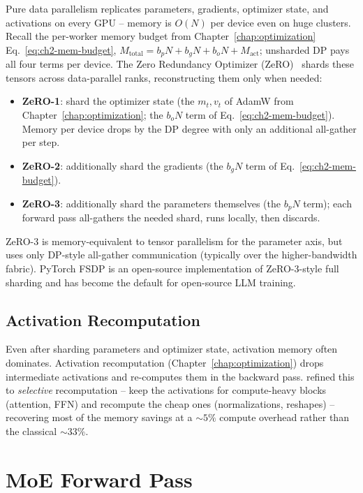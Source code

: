 Pure data parallelism replicates parameters, gradients, optimizer
state, and activations on every GPU -- memory is $O(N)$ per device
even on huge clusters. Recall the per-worker memory budget from
Chapter~\ref{chap:optimization} Eq.~\eqref{eq:ch2-mem-budget},
$M_{\mathrm{total}} = b_p N + b_g N + b_o N + M_{\mathrm{act}}$;
unsharded DP pays all four terms per device. The Zero Redundancy
Optimizer (ZeRO)~\citep{rajbhandari2020zero} shards these tensors
across data-parallel ranks, reconstructing them only when needed:
\begin{itemize}
  \item \textbf{ZeRO-1}: shard the optimizer state (the $m_t, v_t$ of
        AdamW from Chapter~\ref{chap:optimization}; the $b_o N$ term of
        Eq.~\eqref{eq:ch2-mem-budget}). Memory per device drops by
        the DP degree with only an additional all-gather per step.
  \item \textbf{ZeRO-2}: additionally shard the gradients (the
        $b_g N$ term of Eq.~\eqref{eq:ch2-mem-budget}).
  \item \textbf{ZeRO-3}: additionally shard the parameters themselves
        (the $b_p N$ term); each forward pass all-gathers the needed
        shard, runs locally, then discards.
\end{itemize}
ZeRO-3 is memory-equivalent to tensor parallelism for the
parameter axis, but uses only DP-style all-gather communication
(typically over the higher-bandwidth fabric). PyTorch FSDP
\citep{zhao2023fsdp} is an open-source implementation of
ZeRO-3-style full sharding and has become the default for
open-source LLM training.

\subsection{Activation Recomputation}

Even after sharding parameters and optimizer state, activation memory
often dominates. Activation recomputation \citep{chen2016training}
(Chapter~\ref{chap:optimization}) drops intermediate activations and re-computes them in the
backward pass. \citet{korthikanti2023reducing} refined this to
\emph{selective} recomputation -- keep the activations for
compute-heavy blocks (attention, FFN) and recompute the cheap ones
(normalizations, reshapes) -- recovering most of the memory savings
at a $\sim 5\%$ compute overhead rather than the classical $\sim 33\%$.

\section{MoE Forward Pass}

